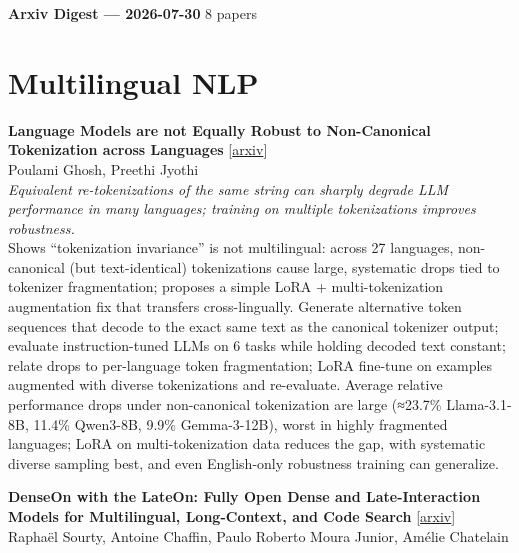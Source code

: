 \documentclass[12pt,letterpaper]{article}
\begin{document}
{\footnotesize\textbf{Arxiv Digest --- 2026-07-30} \hfill 8 papers}

\smallskip

\section*{Multilingual NLP}

{\small\textbf{Language Models are not Equally Robust to Non-Canonical Tokenization across Languages}} {\scriptsize[\href{https://arxiv.org/abs/2607.26831}{arxiv}]}\\
{\scriptsize Poulami Ghosh, Preethi Jyothi}\\

{\small\textit{Equivalent re-tokenizations of the same string can sharply degrade LLM performance in many languages; training on multiple tokenizations improves robustness.}}\\[1pt]
{\footnotesize Shows ``tokenization invariance'' is not multilingual: across 27 languages, non-canonical (but text-identical) tokenizations cause large, systematic drops tied to tokenizer fragmentation; proposes a simple LoRA + multi-tokenization augmentation fix that transfers cross-lingually. Generate alternative token sequences that decode to the exact same text as the canonical tokenizer output; evaluate instruction-tuned LLMs on 6 tasks while holding decoded text constant; relate drops to per-language token fragmentation; LoRA fine-tune on examples augmented with diverse tokenizations and re-evaluate. Average relative performance drops under non-canonical tokenization are large (≈23.7\% Llama-3.1-8B, 11.4\% Qwen3-8B, 9.9\% Gemma-3-12B), worst in highly fragmented languages; LoRA on multi-tokenization data reduces the gap, with systematic diverse sampling best, and even English-only robustness training can generalize.}

\medskip

{\small\textbf{DenseOn with the LateOn: Fully Open Dense and Late-Interaction Models for Multilingual, Long-Context, and Code Search}} {\scriptsize[\href{https://arxiv.org/abs/2607.27178}{arxiv}]}\\
{\scriptsize Rapha\"el Sourty, Antoine Chaffin, Paulo Roberto Moura Junior, Am\'elie Chatelain}\\
\end{document}
